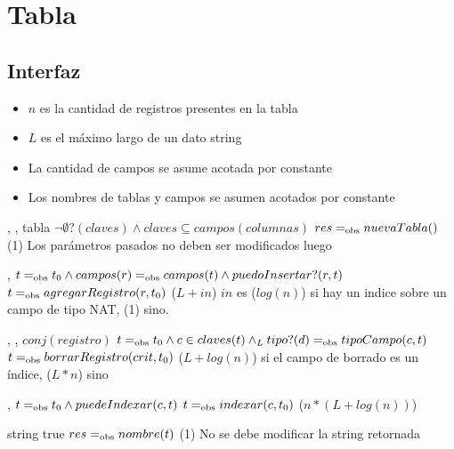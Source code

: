 \section{Tabla}

\subsection{Interfaz}

\iusa{}

\ioperaciones

\begin{itemize}
    \item{$n$ es la cantidad de registros presentes en la tabla}
    \item{$L$ es el máximo largo de un dato string}
    \item{La cantidad de campos se asume acotada por constante}
    \item{Los nombres de tablas y campos se asumen acotados por constante}
\end{itemize}

{   ,
    ,
    } %
{tabla} %
{$\neg\emptyset?(claves) \land claves \subseteq campos(columnas)$} %
{$res =_{\mathrm{obs}} nuevaTabla()$} %
{\bigo(1)} %
{Los parámetros pasados no deben ser modificados luego} %
{} %

{   ,
    }
{}
{$t =_{\mathrm{obs}} t_0 \land campos(r) =_{\mathrm{obs}} campos(t) \land puedoInsertar?(r,t)$}
{$t =_{\mathrm{obs}} agregarRegistro(r,t_0)$}
{\bigo($L + in$)}
{}
{$in$ es \bigo($log(n)$) si hay un indice sobre un campo de tipo NAT, \bigo(1) sino. \\
 }

{   ,
    ,
    }
{$conj(registro)$}
{$t =_{\mathrm{obs}} t_0 \land c \in claves(t) \land_L tipo?(d) =_{\mathrm{obs}} tipoCampo(c,t)$}
{$t =_{\mathrm{obs}} borrarRegistro(crit,t_0)$}
{\bigo($L + log(n)$) si el campo de borrado es un índice, \bigo($L * n$) sino}
{}
{}

{   ,
    }
{}
{$t =_{\mathrm{obs}} t_0 \land puedeIndexar(c,t)$}
{$t =_{\mathrm{obs}} indexar(c,t_0)$}
{\bigo($n * (L + log(n))$)}
{}
{}

{   }
{string}
{true}
{$res =_{\mathrm{obs}} nombre(t)$}
{\bigo(1)}
{No se debe modificar la string retornada}
{}


